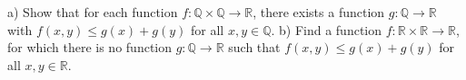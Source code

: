a)  Show that for each function $f:\mathbb{Q} \times \mathbb{Q} \rightarrow \mathbb{R}$, there exists a function $g:\mathbb{Q}\rightarrow \mathbb{R}$ with $f(x,y) \leq g(x)+g(y) $ for all $x,y\in \mathbb{Q}$.
b) Find a function $f:\mathbb{R} \times \mathbb{R} \rightarrow \mathbb{R}$, for which there is no function $g:\mathbb{Q}\rightarrow \mathbb{R}$ such that $f(x,y) \leq g(x)+g(y) $ for all $x,y\in \mathbb{R}$.